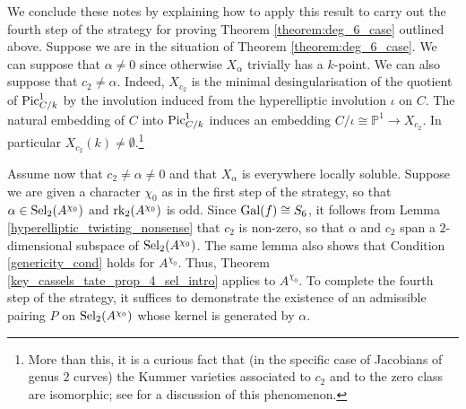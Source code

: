 \documentclass[10pt]{amsart}
\numberwithin{equation}{section}
\theoremstyle{remark}
\theoremstyle{definition}
\theoremstyle{definition}
\theoremstyle{definition}
\theoremstyle{definition}
\theoremstyle{definition}
\theoremstyle{definition}
\theoremstyle{definition}
\theoremstyle{definition}
\begin{document}
We conclude these notes by explaining how to apply this result to carry  out the fourth step of the strategy for proving Theorem \ref{theorem:deg_6_case} outlined above. Suppose we are in the situation of Theorem \ref{theorem:deg_6_case}. We can suppose that $\alpha\neq 0$ since otherwise $X_\alpha$ trivially has a $k$-point. We can also suppose that $c_2\neq \alpha$. Indeed, $X_{c_2}$ is the  minimal desingularisation of the quotient of $\textup{Pic}^{1}_{C/k}$ by the involution induced from the hyperelliptic involution $\iota$ on $C$. The natural embedding of $C$ into $\textup{Pic}^{1}_{C/k}$  induces an embedding $C/\iota \cong \mathbb{P}^1  \rightarrow X_{c_2}$. In particular $X_{c_2}(k)\neq \emptyset$.\footnote{More than this, it is a curious fact that (in the specific case of Jacobians of genus $2$ curves) the Kummer varieties associated to $c_2$ and to the zero class are isomorphic; see \cite[Section 3.2]{GHC22} for a discussion of this phenomenon.}   

Assume now that $c_2\neq \alpha\neq 0$ and that $X_\alpha$ is everywhere locally soluble.   Suppose we are given a character $\chi_0$ as in the first step of the strategy, so that $\alpha \in \textup{Sel}_2(A^{\chi_0})$ and $\textup{rk}_2(A^{\chi_0})$ is odd. Since $\textup{Gal}(f)\cong S_6$, it follows from Lemma \ref{hyperelliptic_twisting_nonsense} that $c_2$ is non-zero, so that $\alpha$ and $c_2$ span a $2$-dimensional subspace of $\textup{Sel}_2(A^{\chi_0})$. The same lemma also shows that Condition \ref{genericity_cond} holds for $A^{\chi_0}$. Thus, Theorem \ref{key_cassels_tate_prop_4_sel_intro} applies to $A^{\chi_0}$.  To complete the fourth step of the strategy, it suffices to demonstrate the existence of an admissible pairing $P$ on $\textup{Sel}_2(A^{\chi_0})$ whose kernel is generated by $\alpha$. 

 

\end{document}
